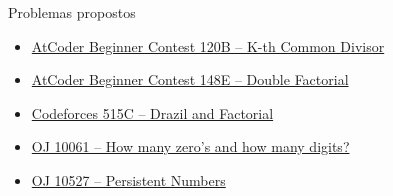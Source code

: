 \begin{frame}[fragile]{Problemas propostos}

    \begin{itemize}
        \item \href{https://atcoder.jp/contests/abc120/tasks/abc120_b}{AtCoder Beginner Contest
            120B -- K-th Common Divisor}

        \item \href{https://atcoder.jp/contests/abc148/tasks/abc148_e}{AtCoder Beginner Contest
            148E -- Double Factorial}

        \item \href{https://codeforces.com/problemset/problem/515/C}{Codeforces 515C -- 
            Drazil and Factorial}

        \item \href{https://onlinejudge.org/index.php?option=com_onlinejudge&Itemid=8&category=24&page=show_problem&problem=1002}{OJ 10061 -- How many zero's and how many digits?}

        \item \href{https://onlinejudge.org/index.php?option=com_onlinejudge&Itemid=8&category=24&page=show_problem&problem=1468}{OJ 10527 -- Persistent Numbers}
    \end{itemize}

\end{frame}

